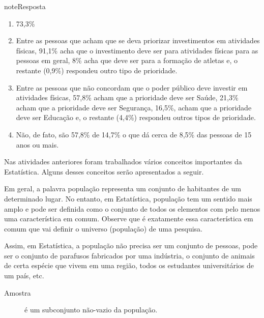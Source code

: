 \begin{sphinxadmonition}{note}{Resposta}
\begin{enumerate}
\end{enumerate}

\begin{enumerate}
\item {} 
73,3\%

\item {} 
Entre as pessoas que acham que se deva priorizar investimentos em atividades físicas, 91,1\% acha que o investimento deve ser para atividades físicas para as pessoas em geral, 8\% acha que deve ser para a formação de atletas e, o restante (0,9\%) respondeu outro tipo de prioridade.

\item {} 
Entre as pessoas que não concordam que o poder público deve investir em atividades físicas, 57,8\% acham que a prioridade deve ser Saúde, 21,3\% acham que a prioridade deve ser Segurança, 16,5\%, acham que a prioridade deve ser Educação e, o restante (4,4\%) respondeu outros tipos de prioridade.

\item {} 
Não, de fato, são 57,8\% de 14,7\% o que dá cerca de 8,5\% das pessoas de 15 anos ou mais.

\end{enumerate}
\end{sphinxadmonition}


\arrange{ }
\label{\detokenize{PE103-1:organizando-as-ideias}}\label{\detokenize{PE103-1::doc}}
Nas atividades anteriores foram trabalhados vários conceitos importantes da Estatística. Alguns desses conceitos serão apresentados a seguir.
\label{\detokenize{PE103-1:sub-conceitos-basicos}}

Em geral, a palavra população representa um conjunto de habitantes de um determinado lugar. No entanto, em Estatística, população tem um sentido mais amplo e pode ser definida como o conjunto de todos os elementos com pelo menos uma característica em comum. Observe que é exatamente essa característica em comum que vai definir o universo (população) de uma pesquisa.

Assim, em Estatística, a população não precisa ser um conjunto de pessoas, pode ser o conjunto de parafusos fabricados por uma indústria, o conjunto de animais de certa espécie que vivem em uma região, todos os estudantes universitários de um país, etc.
\begin{description}
\item[{Amostra}] \leavevmode{}\label{\detokenize{PE103-1:term-amostra}}
é um subconjunto não-vazio da população.

\end{description}

